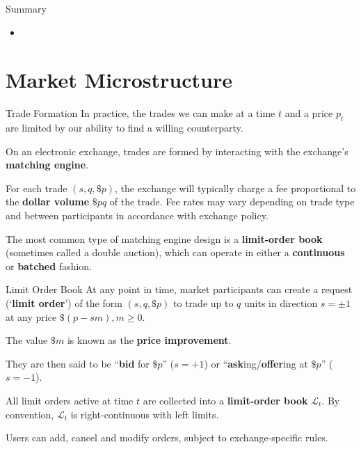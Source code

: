 \documentclass{beamer}
\begin{document}
\begin{frame}{Summary}
	\begin{itemize}
		\item 
	\end{itemize}
\end{frame}

\section{Market Microstructure}
\begin{frame}{Trade Formation}
	In practice, the trades we can make at a time $t$ and a price $p_t$ are limited by our ability to find a willing counterparty.

	\pause
	On an electronic exchange, trades are formed by interacting with the exchange's \textbf{matching engine}.%

	\pause

	For each trade $(s,q,\$p)$, the exchange will typically charge a fee proportional to the \textbf{dollar volume} $\$pq$ of the trade. Fee rates may vary depending on trade type and between participants in accordance with exchange policy.

	\pause

	The most common type of matching engine design is a \textbf{limit-order book} (sometimes called a double auction), which can operate in either a \textbf{continuous} or \textbf{batched} fashion.
\end{frame}

\begin{frame}{Limit Order Book}%
	At any point in time, market participants can create a request (`\textbf{limit order}') of the form $(s,q,\$p)$ to trade up to $q$ units in direction $s=\pm1$ at any price $\$(p-sm), m\geq0$.%

	The value $\$m$ is known as the \textbf{price improvement}. %
	
	They are then said to be ``\textbf{bid} for $\$p$'' ($s=+1$) or ``\textbf{ask}ing/\textbf{offer}ing at $\$p$'' ($s=-1$). %

	\pause

	All limit orders active at time $t$ are collected into a \textbf{limit-order book} $\mathcal{L}_t$. By convention, $\mathcal{L}_t$ is right-continuous with left limits.%

	Users can add, cancel and modify orders, subject to exchange-specific rules.%
\end{frame}
\end{document}
